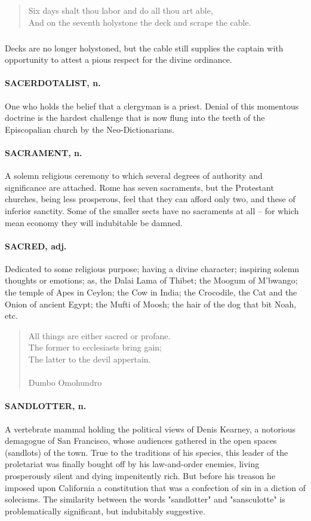 \documentclass[11pt]{article}
\begin{document}
\begin{quote}   Six days shalt thou labor and do all thou art able, \\
  And on the seventh holystone the deck and scrape the cable. \end{quote}

\subparagraph{} Decks are no longer holystoned, but the cable still supplies the
captain with opportunity to attest a pious respect for the divine
ordinance.

\paragraph{SACERDOTALIST, n.}  One who holds the belief that a clergyman is a
priest.  Denial of this momentous doctrine is the hardest challenge
that is now flung into the teeth of the Episcopalian church by the
Neo-Dictionarians.

\paragraph{SACRAMENT, n.}  A solemn religious ceremony to which several degrees of
authority and significance are attached.  Rome has seven sacraments,
but the Protestant churches, being less prosperous, feel that they can
afford only two, and these of inferior sanctity.  Some of the smaller
sects have no sacraments at all -- for which mean economy they will
indubitable be damned.

\paragraph{SACRED, adj.}  Dedicated to some religious purpose; having a divine
character; inspiring solemn thoughts or emotions; as, the Dalai Lama
of Thibet; the Moogum of M'bwango; the temple of Apes in Ceylon; the
Cow in India; the Crocodile, the Cat and the Onion of ancient Egypt;
the Mufti of Moosh; the hair of the dog that bit Noah, etc.

\begin{quote}   All things are either sacred or profane. \\
  The former to ecclesiasts bring gain; \\
  The latter to the devil appertain. \\
 \\
Dumbo Omohundro \end{quote}


\paragraph{SANDLOTTER, n.}  A vertebrate mammal holding the political views of
Denis Kearney, a notorious demagogue of San Francisco, whose audiences
gathered in the open spaces (sandlots) of the town.  True to the
traditions of his species, this leader of the proletariat was finally
bought off by his law-and-order enemies, living prosperously silent
and dying impenitently rich.  But before his treason he imposed upon
California a constitution that was a confection of sin in a diction of
solecisms.  The similarity between the words "sandlotter" and
"sansculotte" is problematically significant, but indubitably
suggestive.
\end{document}
